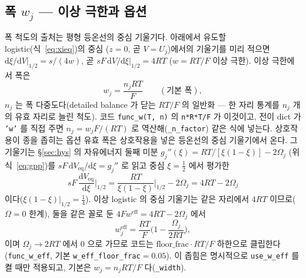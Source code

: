 \documentclass[11pt,a4paper]{article}
\newcommand{\dd}{\mathrm{d}}
\newcommand{\eff}{\mathrm{eff}}
\newcommand{\eq}{\mathrm{eq}}
\newcommand{\code}[1]{\texttt{#1}}
\begin{document}
\subsection{폭 $w_j$ — 이상 극한과 옵션}
폭 척도의 출처는 평형 등온선의 중심 기울기다. 아래에서 유도할 logistic(식~\eqref{eq:xieq})의 중심
($z=0$, 곧 $V=U_j$)에서의 기울기를 미리 적으면 $\dd\xi/\dd V|_{1/2}=s/(4w)$, 곧 $sF\,\dd V/\dd\xi|_{1/2}=4RT$
($w=RT/F$ 이상 극한). 이상 극한에서 폭은
\begin{equation}
w_j=\frac{n_jRT}{F}\qquad(\text{기본 폭}),
\label{eq:wbase}
\end{equation}
$n_j$ 는 폭 다중도다(detailed balance 가 닫는 $RT/F$ 의 일반화 --- 한 자리 통계를 $n_j$ 개의 유효 자리로 늘린 척도).
코드 \code{func\_w(T, n)} 의 \code{n*R*T/F} 가 이것이고, 전이 dict 가 \code{'w'} 를 직접 주면 $n_j=w_jF/(RT)$ 로
역산해(\code{\_n\_factor}) 같은 식에 넣는다. 상호작용이 종을 좁히는 옵션 유효 폭은 상호작용을 넣은 등온선의 중심
기울기에서 온다. 그 기울기는 \S\ref{sec:hys} 의 자유에너지 둘째 미분 $g_j''(\xi)=RT/[\xi(1-\xi)]-2\Omega_j$
(위 식~\eqref{eq:gpp})를 $sF\,\dd V_\eq/\dd\xi=g_j''$ 로 읽고 중심 $\xi=\tfrac12$ 에서 평가한
\begin{equation}
sF\,\frac{\dd V_\eq}{\dd\xi}\Big|_{1/2}=\frac{RT}{\xi(1-\xi)}\Big|_{1/2}-2\Omega_j=4RT-2\Omega_j
\label{eq:isoslope}
\end{equation}
이다($\xi(1-\xi)|_{1/2}=\tfrac14$). 이상 logistic 의 중심 기울기는 같은 자리에서 $4RT$ 이므로($\Omega=0$ 한계), 둘을
같은 꼴로 둔 $4Fw^\eff=4RT-2\Omega_j$ 에서
\begin{equation}
w_j^\eff=\frac{RT}{F}\Big(1-\frac{\Omega_j}{2RT}\Big),
\label{eq:weff}
\end{equation}
이며 $\Omega_j\to2RT$ 에서 $0$ 으로 가므로 코드는 $\mathrm{floor\_frac}\cdot RT/F$ 하한으로 클립한다(\code{func\_w\_eff},
기본 \code{w\_eff\_floor\_frac}$=0.05$). 이 좁힘은 명시적으로 \code{use\_w\_eff} 를 켤 때만 적용되고, 기본은
$w_j=n_jRT/F$ 다(\code{\_width}).
\end{document}
